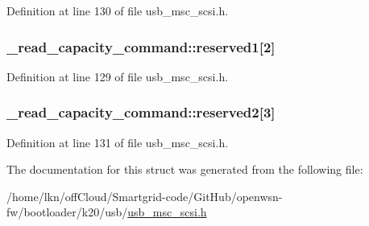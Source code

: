 Definition at line 130 of file usb\+\_\+msc\+\_\+scsi.\+h.

\subsubsection[{\texorpdfstring{reserved1}{reserved1}}]{ \+\_\+read\+\_\+capacity\+\_\+command\+::reserved1\mbox{[}2\mbox{]}}\hypertarget{struct__read__capacity__command_a5e9e4e741d86e941953901fa9da22ea0}{}\label{struct__read__capacity__command_a5e9e4e741d86e941953901fa9da22ea0}


Definition at line 129 of file usb\+\_\+msc\+\_\+scsi.\+h.

\subsubsection[{\texorpdfstring{reserved2}{reserved2}}]{ \+\_\+read\+\_\+capacity\+\_\+command\+::reserved2\mbox{[}3\mbox{]}}\hypertarget{struct__read__capacity__command_ab762a655b0bff68a871acc459dad4a0c}{}\label{struct__read__capacity__command_ab762a655b0bff68a871acc459dad4a0c}


Definition at line 131 of file usb\+\_\+msc\+\_\+scsi.\+h.



The documentation for this struct was generated from the following file\+:\begin{DoxyCompactItemize}
\item 
/home/lkn/off\+Cloud/\+Smartgrid-\/code/\+Git\+Hub/openwsn-\/fw/bootloader/k20/usb/\hyperlink{usb__msc__scsi_8h}{usb\+\_\+msc\+\_\+scsi.\+h}\end{DoxyCompactItemize}
